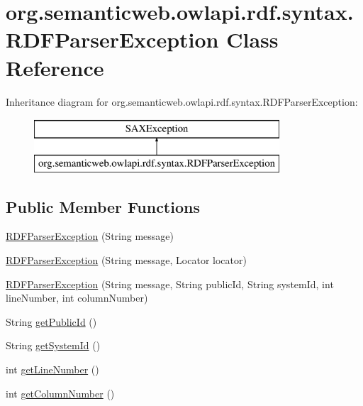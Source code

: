 \hypertarget{classorg_1_1semanticweb_1_1owlapi_1_1rdf_1_1syntax_1_1_r_d_f_parser_exception}{\section{org.\-semanticweb.\-owlapi.\-rdf.\-syntax.\-R\-D\-F\-Parser\-Exception Class Reference}
\label{classorg_1_1semanticweb_1_1owlapi_1_1rdf_1_1syntax_1_1_r_d_f_parser_exception}
}
Inheritance diagram for org.\-semanticweb.\-owlapi.\-rdf.\-syntax.\-R\-D\-F\-Parser\-Exception\-:\begin{figure}[H]
\begin{center}
\leavevmode
\includegraphics[height=2.000000cm]{classorg_1_1semanticweb_1_1owlapi_1_1rdf_1_1syntax_1_1_r_d_f_parser_exception}
\end{center}
\end{figure}
\subsection*{Public Member Functions}
\begin{DoxyCompactItemize}
\item 
\hyperlink{classorg_1_1semanticweb_1_1owlapi_1_1rdf_1_1syntax_1_1_r_d_f_parser_exception_a6036104e58d5bd5be8f56b7989e7294e}{R\-D\-F\-Parser\-Exception} (String message)
\item 
\hyperlink{classorg_1_1semanticweb_1_1owlapi_1_1rdf_1_1syntax_1_1_r_d_f_parser_exception_a1d48d60bcf43de7bc6a80f88c2e061bc}{R\-D\-F\-Parser\-Exception} (String message, Locator locator)
\item 
\hyperlink{classorg_1_1semanticweb_1_1owlapi_1_1rdf_1_1syntax_1_1_r_d_f_parser_exception_a7ec5629a38a4e8e28371248d7f5b438f}{R\-D\-F\-Parser\-Exception} (String message, String public\-Id, String system\-Id, int line\-Number, int column\-Number)
\item 
String \hyperlink{classorg_1_1semanticweb_1_1owlapi_1_1rdf_1_1syntax_1_1_r_d_f_parser_exception_aea8da8596e1751bd40a8e4bfcdf3c8db}{get\-Public\-Id} ()
\item 
String \hyperlink{classorg_1_1semanticweb_1_1owlapi_1_1rdf_1_1syntax_1_1_r_d_f_parser_exception_ad0f55843b2cb2a5417871be233828df6}{get\-System\-Id} ()
\item 
int \hyperlink{classorg_1_1semanticweb_1_1owlapi_1_1rdf_1_1syntax_1_1_r_d_f_parser_exception_a9e9d8684e538547db81aec382701370b}{get\-Line\-Number} ()
\item 
int \hyperlink{classorg_1_1semanticweb_1_1owlapi_1_1rdf_1_1syntax_1_1_r_d_f_parser_exception_ac7891530aec91db4edc21277693983ec}{get\-Column\-Number} ()
\end{DoxyCompactItemize}
